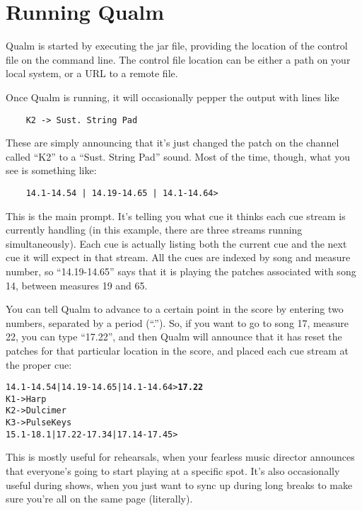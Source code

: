 \documentclass{article}
\newcommand{\q}{{\textsf{Qualm}}\xspace}
\begin{document}
\section{Running \q}

\q is started by executing the jar file, providing the location of the
control file on the command line.  The control file location can be
either a path on your local system, or a URL to a remote file.

Once \q is running, it will occasionally pepper the output with lines
like

\begin{verbatim}
    K2 -> Sust. String Pad
\end{verbatim}

These are simply announcing that it's just changed the patch on the
channel called ``K2'' to a ``Sust. String Pad'' sound.  Most of the time,
though, what you see is something like:

\begin{verbatim}
    14.1-14.54 | 14.19-14.65 | 14.1-14.64>
\end{verbatim}

This is the main prompt.  It's telling you what cue it thinks each cue
stream is currently handling (in this example, there are three
streams running simultaneously).  Each cue is actually listing both
the current cue and the next cue it will expect in that stream.  All
the cues are indexed by song and measure number, so ``14.19-14.65''
says that it is playing the patches associated with song 14, between
measures 19 and 65.

You can tell \q to advance to a certain point in the score by
entering two numbers, separated by a period (``.'').  So, if you want to
go to song 17, measure 22, you can type ``17.22'', and then \q will
announce that it has reset the patches for that particular location in
the score, and placed each cue stream at the proper cue:


\begin{alltt}
    14.1-14.54 | 14.19-14.65 | 14.1-14.64> \textbf{17.22}
    K1 -> Harp
    K2 -> Dulcimer
    K3 -> Pulse Keys
    15.1-18.1 | 17.22-17.34 | 17.14-17.45>
\end{alltt}

This is mostly useful for rehearsals, when your fearless music
director announces that everyone's going to start playing at a specific
spot.  It's also occasionally useful during shows, when you just want
to sync up during long breaks to make sure you're all on the same page
(literally).
\end{document}
